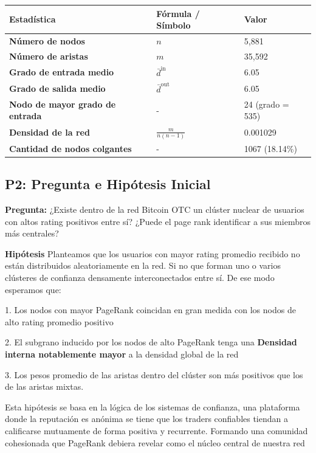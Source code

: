 \documentclass{article}
\begin{document}
\begin{center}
\begin{tabular}{lll}
\toprule
Estadística & Fórmula / Símbolo & Valor \\
\midrule
\textbf{Número de nodos} & $n$ & 5,881 \\
\textbf{Número de aristas} & $m$ & 35,592 \\
\textbf{Grado de entrada medio} & $\bar{d}^{\text{in}}$ & 6.05 \\
\textbf{Grado de salida medio} & $\bar{d}^{\text{out}}$ & 6.05 \\
\textbf{Nodo de mayor grado de entrada} & - & 24 (grado = 535) \\
\textbf{Densidad de la red} & $\frac{m}{n(n-1)}$ & 0.001029 \\
\textbf{Cantidad de nodos colgantes} & - & 1067 (18.14\%) \\
\bottomrule
\end{tabular}
\end{center}



\subsection*{P2: Pregunta e Hipótesis Inicial}

\textbf{Pregunta:}
¿Existe dentro de la red Bitcoin OTC un clúster nuclear de usuarios con altos rating positivos entre sí? 
¿Puede el page rank identificar a sus miembros más centrales?

\textbf{Hipótesis}
Planteamos que los usuarios con mayor rating promedio recibido no están distribuidos aleatoriamente en la red. Si no que forman uno o varios clústeres de confianza densamente interconectados entre sí. De ese modo esperamos que:

1. Los nodos con mayor PageRank coincidan en gran medida con los nodos de alto rating promedio positivo

2. El subgrano inducido por los nodos de alto PageRank tenga una \textbf{Densidad interna notablemente mayor} a la densidad global de la red

3. Los pesos promedio de las aristas dentro del clúster son más positivos que los de las aristas mixtas.

Esta hipótesis se basa en la lógica de los sistemas de confianza, una plataforma donde la reputación es anónima se tiene que los traders confiables tiendan a calificarse mutuamente de forma positiva y recurrente. Formando una comunidad cohesionada que PageRank debiera revelar como el núcleo central de nuestra red
\end{document}
